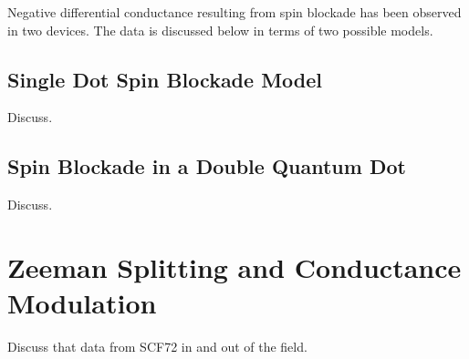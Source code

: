 Negative differential conductance resulting from spin blockade has been observed in two devices. The data is discussed below in terms of two possible models.

\subsection{Single Dot Spin Blockade Model}

Discuss.

\subsection{Spin Blockade in a Double Quantum Dot}

%
%

Discuss.

\section{Zeeman Splitting and Conductance Modulation}

Discuss that data from SCF72 in and out of the field.